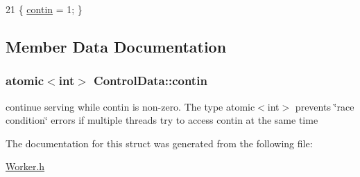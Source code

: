 \begin{DoxyCode}
21 \{ \hyperlink{structControlData_ac8fbf80345423cf5650ae64bfb10dc88}{contin} = 1; \}
\end{DoxyCode}


\subsection{Member Data Documentation}
\hypertarget{structControlData_ac8fbf80345423cf5650ae64bfb10dc88}{}
\subsubsection[{contin}]{\setlength{\rightskip}{0pt plus 5cm}atomic$<$int$>$ Control\+Data\+::contin}\label{structControlData_ac8fbf80345423cf5650ae64bfb10dc88}
continue serving while contin is non-\/zero. The type atomic$<$int$>$ prevents \char`\"{}race condition\char`\"{} errors if multiple threads try to access contin at the same time 

The documentation for this struct was generated from the following file\+:\begin{DoxyCompactItemize}
\item 
\hyperlink{Worker_8h}{Worker.\+h}\end{DoxyCompactItemize}
